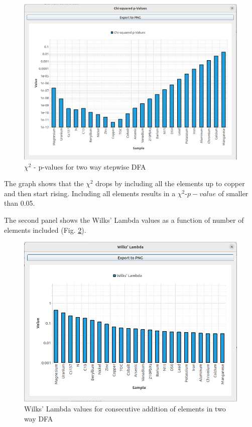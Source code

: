 \documentclass[12pt]{report}
\begin{document}
\begin{figure}[ht]
    \centering
    \includegraphics[width=14cm]{Figures/Chi2p-value-stepwise-twoway-DFA.png}
    \caption{$\chi^2$ - p-values for two way stepwise DFA}
    \label{fig:two-way-DFA-analysis}
\end{figure}
\FloatBarrier

The graph shows that the $\chi^2$ drops by including all the elements up to copper and then start rising. Including all elements results in a $\chi^2$-$p-value$ of smaller than 0.05. 

The second panel shows the Wilks' Lambda values as a function of number of elements included (Fig. \ref{fig:two-way-wilks-lambda}). 

\begin{figure}[ht]
    \centering
    \includegraphics[width=14cm]{Figures/Wilks-Lambda-stepwise-twoway-DFA.png}
    \caption{Wilks' Lambda values for consecutive addition of elements in two way DFA}
    \label{fig:two-way-wilks-lambda}
\end{figure}
\FloatBarrier
\end{document}
